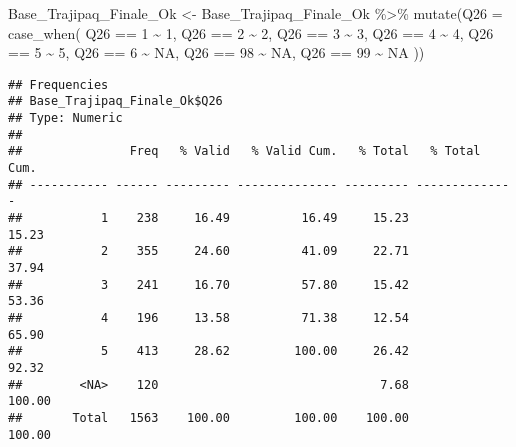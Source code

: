 \documentclass[
]{article}
\newenvironment{Shaded}{\begin{snugshade}}{\end{snugshade}}
\newcommand{\AttributeTok}[1]{\textcolor[rgb]{0.77,0.63,0.00}{#1}}
\newcommand{\ConstantTok}[1]{\textcolor[rgb]{0.00,0.00,0.00}{#1}}
\newcommand{\DecValTok}[1]{\textcolor[rgb]{0.00,0.00,0.81}{#1}}
\newcommand{\FunctionTok}[1]{\textcolor[rgb]{0.00,0.00,0.00}{#1}}
\newcommand{\NormalTok}[1]{#1}
\newcommand{\OtherTok}[1]{\textcolor[rgb]{0.56,0.35,0.01}{#1}}
\newcommand{\SpecialCharTok}[1]{\textcolor[rgb]{0.00,0.00,0.00}{#1}}
\begin{document}
\begin{Shaded}
\begin{Highlighting}[]
\NormalTok{Base\_Trajipaq\_Finale\_Ok }\OtherTok{\textless{}{-}}
\NormalTok{  Base\_Trajipaq\_Finale\_Ok }\SpecialCharTok{\%\textgreater{}\%}
  \FunctionTok{mutate}\NormalTok{(}\AttributeTok{Q26 =} \FunctionTok{case\_when}\NormalTok{(}
\NormalTok{    Q26 }\SpecialCharTok{==} \DecValTok{1} \SpecialCharTok{\textasciitilde{}} \DecValTok{1}\NormalTok{,}
\NormalTok{    Q26 }\SpecialCharTok{==} \DecValTok{2} \SpecialCharTok{\textasciitilde{}} \DecValTok{2}\NormalTok{,}
\NormalTok{    Q26 }\SpecialCharTok{==} \DecValTok{3} \SpecialCharTok{\textasciitilde{}} \DecValTok{3}\NormalTok{,}
\NormalTok{    Q26 }\SpecialCharTok{==} \DecValTok{4} \SpecialCharTok{\textasciitilde{}} \DecValTok{4}\NormalTok{,}
\NormalTok{    Q26 }\SpecialCharTok{==} \DecValTok{5} \SpecialCharTok{\textasciitilde{}} \DecValTok{5}\NormalTok{,}
\NormalTok{    Q26 }\SpecialCharTok{==} \DecValTok{6} \SpecialCharTok{\textasciitilde{}} \ConstantTok{NA}\NormalTok{,}
\NormalTok{    Q26 }\SpecialCharTok{==} \DecValTok{98} \SpecialCharTok{\textasciitilde{}} \ConstantTok{NA}\NormalTok{,}
\NormalTok{    Q26 }\SpecialCharTok{==} \DecValTok{99} \SpecialCharTok{\textasciitilde{}} \ConstantTok{NA}
\NormalTok{  ))}
\end{Highlighting}
\end{Shaded}

\begin{Shaded}
\end{Shaded}

\begin{verbatim}
## Frequencies  
## Base_Trajipaq_Finale_Ok$Q26  
## Type: Numeric  
## 
##               Freq   % Valid   % Valid Cum.   % Total   % Total Cum.
## ----------- ------ --------- -------------- --------- --------------
##           1    238     16.49          16.49     15.23          15.23
##           2    355     24.60          41.09     22.71          37.94
##           3    241     16.70          57.80     15.42          53.36
##           4    196     13.58          71.38     12.54          65.90
##           5    413     28.62         100.00     26.42          92.32
##        <NA>    120                               7.68         100.00
##       Total   1563    100.00         100.00    100.00         100.00
\end{verbatim}
\end{document}
